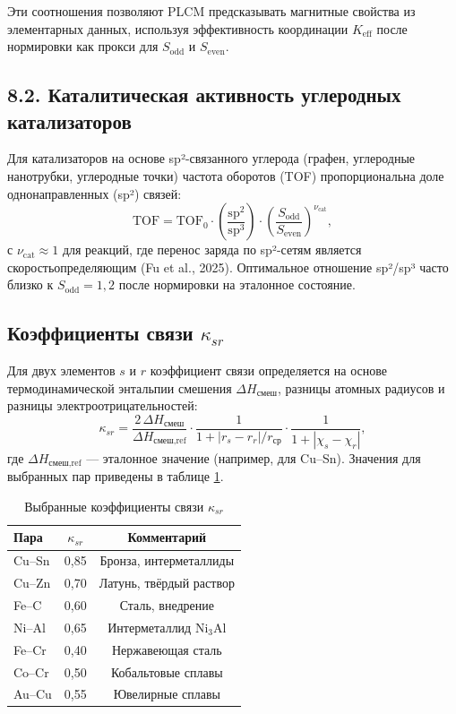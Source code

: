 \documentclass[12pt,a4paper]{article}
\begin{document}
	Эти соотношения позволяют PLCM предсказывать магнитные свойства из элементарных данных, используя эффективность координации \(K_{\text{eff}}\) после нормировки как прокси для \(S_{\text{odd}}\) и \(S_{\text{even}}\).
	
	\subsection*{8.2. Каталитическая активность углеродных катализаторов}
	Для катализаторов на основе sp²-связанного углерода (графен, углеродные нанотрубки, углеродные точки) частота оборотов (TOF) пропорциональна доле однонаправленных (sp²) связей:
	\[
	\text{TOF} = \text{TOF}_0 \cdot \left( \frac{\text{sp}^2}{\text{sp}^3} \right) \cdot \left( \frac{S_{\text{odd}}}{S_{\text{even}}} \right)^{\nu_{\text{cat}}},
	\]
	с \(\nu_{\text{cat}} \approx 1\) для реакций, где перенос заряда по sp²-сетям является скоростьопределяющим (Fu et al., 2025). Оптимальное отношение sp²/sp³ часто близко к \(S_{\text{odd}} = 1,2\) после нормировки на эталонное состояние.
	
	\subsection{Коэффициенты связи \(\kappa_{sr}\)}
	
	Для двух элементов \(s\) и \(r\) коэффициент связи определяется на основе термодинамической энтальпии смешения \(\Delta H_{\text{смеш}}\), разницы атомных радиусов и разницы электроотрицательностей:
	\[
	\kappa_{sr} = \frac{2\,\Delta H_{\text{смеш}}}{\Delta H_{\text{смеш,ref}}} \cdot
	\frac{1}{1 + |r_s - r_r|/r_{\text{ср}}} \cdot
	\frac{1}{1 + |\chi_s - \chi_r|},
	\]
	где \(\Delta H_{\text{смеш,ref}}\) — эталонное значение (например, для Cu–Sn). Значения для выбранных пар приведены в таблице \ref{tab:kappa}.
	
	\begin{table}[htbp]
		\centering
		\caption{Выбранные коэффициенты связи \(\kappa_{sr}\)}
		\label{tab:kappa}
		\begin{tabular}{lcc}
			\toprule
			Пара & \(\kappa_{sr}\) & Комментарий \\
			\midrule
			Cu–Sn & 0,85 & Бронза, интерметаллиды \\
			Cu–Zn & 0,70 & Латунь, твёрдый раствор \\
			Fe–C  & 0,60 & Сталь, внедрение \\
			Ni–Al & 0,65 & Интерметаллид Ni\(_{3}\)Al \\
			Fe–Cr & 0,40 & Нержавеющая сталь \\
			Co–Cr & 0,50 & Кобальтовые сплавы \\
			Au–Cu & 0,55 & Ювелирные сплавы \\
			\bottomrule
		\end{tabular}
	\end{table}
	
\end{document}
